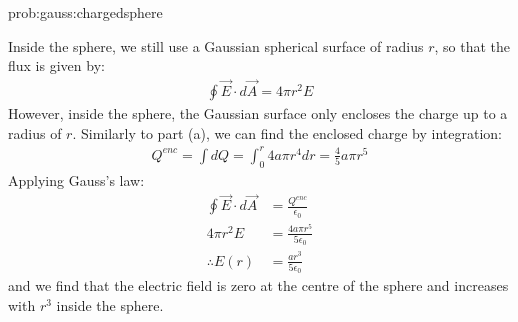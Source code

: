 \begin{solutionParts}{prob:gauss:chargedsphere}
{\item Inside the sphere, we still use a Gaussian spherical surface of radius $r$, so that the flux is given by:
\begin{align*}
\oint \vec E\cdot d\vec A=4\pi r^2 E
\end{align*}
However, inside the sphere, the Gaussian surface only encloses the charge up to a radius of $r$. Similarly to part (a), we can find the enclosed charge by integration:
\begin{align*}
Q^{enc}=\int dQ =\int_0^r 4a\pi r^4 dr=\frac{4}{5}a\pi r^5
\end{align*}
Applying Gauss's law:
\begin{align*}
\oint \vec E\cdot d\vec A&= \frac{Q^{enc}}{\epsilon_0}\\
4\pi r^2 E&= \frac{4a\pi r^5}{5\epsilon_0}\\
\therefore E(r)&=\frac{ar^3}{5\epsilon_0}
\end{align*}
and we find that the electric field is zero at the centre of the sphere and increases with $r^3$ inside the sphere.
}
\end{solutionParts}

